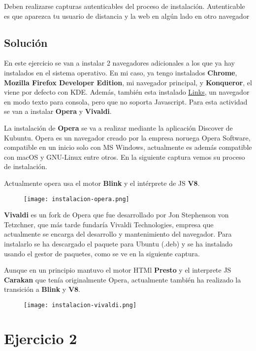 Deben realizarse capturas autenticables del proceso de instalación.  Autenticable es que aparezca tu usuario de distancia y la web en algún lado en otro navegador

\subsection{Solución}
En este ejercicio se van a instalar 2 navegadores adicionales a los que ya hay instalados en el sistema operativo. En mi caso, ya tengo instalados \textbf{Chrome}, \textbf{Mozilla Firefox Developer Edition}, mi navegador principal, y \textbf{Konqueror}, el viene por defecto con KDE. Además, también esta instalado \href{https://es.wikipedia.org/wiki/Links}{Links}, un navegador en modo texto para consola, pero que no soporta Javascript. Para esta actividad se van a instalar \textbf{Opera} y \textbf{Vivaldi}.

La instalación de \textbf{Opera} se va a realizar mediante la aplicación Discover de Kubuntu. Opera es un navegador creado por la empresa noruega Opera Software, compatible en un inicio solo con MS Windows, actualmente es además compatible con macOS y GNU-Linux entre otros. En la siguiente captura vemos su proceso de instalación.

Actualmente opera usa el motor \textbf{Blink} y el intérprete de JS \textbf{V8}.

\begin{figure}[H]
    \centering
    \texttt{[image: instalacion-opera.png]}
\end{figure}

\textbf{Vivaldi} es un fork de Opera que fue desarrollado por Jon Stephenson von Tetzchner, que más tarde fundaría Vivaldi Technologies, empresa que actualmente se encarga del desarrollo y mantenimiento del navegador. Para instalarlo se ha descargado el paquete para Ubuntu (.deb) y se ha instalado usando el gestor de paquetes, como se ve en la siguiente captura.

Aunque en un principio mantuvo el motor HTMl \textbf{Presto} y el interprete JS \textbf{Carakan} que tenía originalmente Opera, actualmente también ha realizado la transición a \textbf{Blink} y \textbf{V8}.

\begin{figure}[H]
    \centering
    \texttt{[image: instalacion-vivaldi.png]}
\end{figure}

\section{Ejercicio 2}
